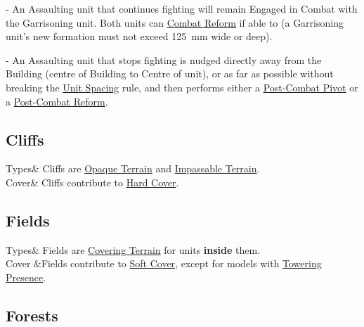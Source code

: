 \begin{tableterrain}
\hspace*{0.3cm}- An Assaulting unit that continues fighting will remain Engaged in Combat with the Garrisoning unit. Both units can \hyperref[combat_reform]{Combat Reform} if able to (a Garrisoning unit's new formation must not exceed \SI{125}{\milli\meter} wide or deep).\par
\hspace*{0.3cm}- An Assaulting unit that stops fighting is nudged  directly away from the Building (centre of Building to Centre of unit), or as far as possible without breaking the \hyperref[unit_spacing]{Unit Spacing} rule, and then performs either a \hyperref[post_combat_pivot]{Post-Combat Pivot} or a \hyperref[post_combat_reform]{Post-Combat Reform}.
\\
\end{tableterrain}

\subsection{Cliffs}
\label{cliffs}

\begin{tableterrain}%
    Types&%
    Cliffs are \hyperref[opaque_terrain]{Opaque Terrain} and \hyperref[impassable_terrain]{Impassable Terrain}.%
    \\
    Cover&
    Cliffs contribute to \hyperref[covering_terrain]{Hard Cover}.\\
\end{tableterrain}

\subsection{Fields}
\label{fields}

\begin{tableterrain}
Types& Fields are \hyperref[covering_terrain]{Covering Terrain} for units \textbf{inside} them.\\
Cover &Fields contribute to \hyperref[covering_terrain]{Soft Cover}, except for models with \hyperref[towering_presence]{Towering Presence}.\\
\end{tableterrain}

\subsection{Forests}
\label{forests}

